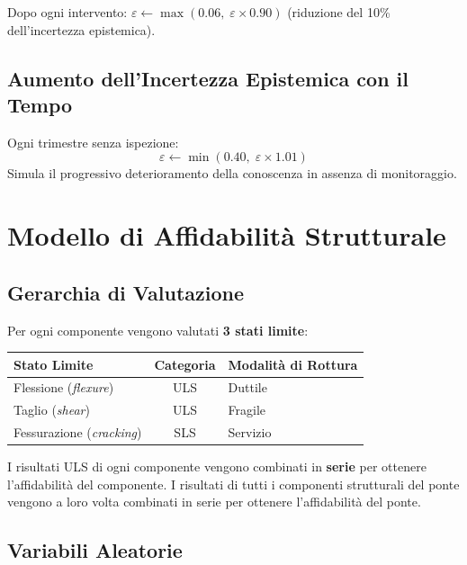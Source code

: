 \documentclass[11pt,a4paper]{article}
\begin{document}
Dopo ogni intervento: $\varepsilon \leftarrow \max(0.06,\; \varepsilon \times 0.90)$ (riduzione del 10\% dell'incertezza epistemica).

\subsection{Aumento dell'Incertezza Epistemica con il Tempo}

Ogni trimestre senza ispezione:
\begin{equation}
  \varepsilon \leftarrow \min(0.40,\; \varepsilon \times 1.01)
\end{equation}
Simula il progressivo deterioramento della conoscenza in assenza di monitoraggio.

\section{Modello di Affidabilità Strutturale}

\subsection{Gerarchia di Valutazione}

Per ogni componente vengono valutati \textbf{3 stati limite}:

\begin{center}
\begin{tabular}{lcl}
\toprule
\textbf{Stato Limite} & \textbf{Categoria} & \textbf{Modalità di Rottura} \\
\midrule
Flessione (\textit{flexure}) & ULS & Duttile \\
Taglio (\textit{shear})      & ULS & Fragile \\
Fessurazione (\textit{cracking}) & SLS & Servizio \\
\bottomrule
\end{tabular}
\end{center}

I risultati ULS di ogni componente vengono combinati in \textbf{serie} per ottenere l'affidabilità del componente. I risultati di tutti i componenti strutturali del ponte vengono a loro volta combinati in serie per ottenere l'affidabilità del ponte.

\subsection{Variabili Aleatorie}
\end{document}
